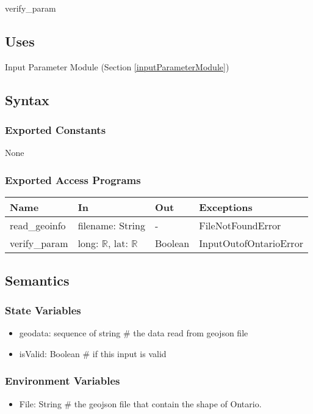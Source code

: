 \documentclass[12pt, titlepage]{article}
\begin{document}
verify\_param

\subsection{Uses}
Input Parameter Module (Section \ref{inputParameterModule})

\subsection{Syntax}

\subsubsection{Exported Constants}
None

\subsubsection{Exported Access Programs}

\begin{center}
\begin{tabular}{p{3cm} p{4cm} p{2cm} p{5cm}}
\hline
\textbf{Name} & \textbf{In} & \textbf{Out} & \textbf{Exceptions} \\
\hline
read\_geoinfo & filename: String & - & FileNotFoundError\\
verify\_param & long: $\mathbb{R}$, lat: $\mathbb{R}$ & Boolean & InputOutofOntarioError \\
\hline
\end{tabular}
\end{center}

\subsection{Semantics}

\subsubsection{State Variables}
\begin{itemize}
\item geodata: sequence of string \# the data read from geojson file
\item isValid: Boolean \# if this input is valid

\end{itemize}

\subsubsection{Environment Variables}
\begin{itemize}

\item File: String \# the geojson file that contain the shape of Ontario.

\end{itemize}
\end{document}
